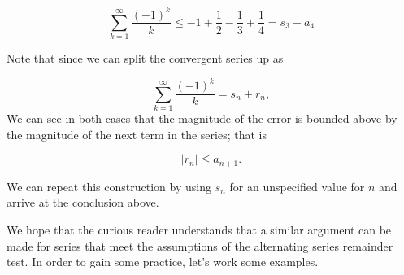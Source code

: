\documentclass{ximera}
\begin{document}
\begin{model}
  \[
  \sum_{k=1}^{\infty} \frac{(-1)^k}{k} \leq -1+\frac{1}{2}-\frac{1}{3} +\frac{1}{4} = s_3 -a_4
  \]
  
Note that since we can split the convergent series up as

\[
\sum_{k=1}^{\infty} \frac{(-1)^k}{k} = s_n +r_n,
\]
We can see in both cases that the magnitude of the error is bounded above by the magnitude of the next term in the series; that is 

\[\big| r_n \big| \leq a_{n+1}.\]

We can repeat this construction by using $s_n$ for an unspecified value for $n$ and arrive at the conclusion above.  
\end{model}

We hope that the curious reader understands that a similar argument can be made for series that meet the assumptions of the alternating series remainder test.  In order to gain some practice, let's work some examples.
\end{document}
